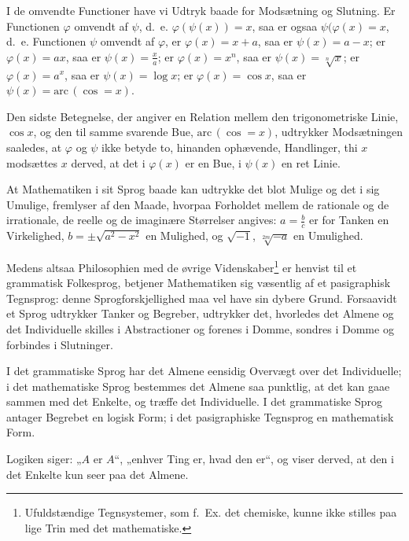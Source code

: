 \documentclass[12pt]{book}
\newcommand{\opage}[1]{\marginnote{\footnotesize\textit{[#1]}}}
\begin{document}
I de omvendte Functioner have vi Udtryk baade for Modsætning og Slutning. Er
Functionen $\varphi$ omvendt af $\psi$, d.\ e. $\varphi(\psi(x)) = x$, saa er
ogsaa $\psi(\varphi(x) = x$, d.\ e. Functionen $\psi$ omvendt af $\varphi$, er
$\varphi(x) = x+a$, saa er $\psi(x) = a-x$; er $\varphi(x) = ax$, saa er
$\psi(x) = \frac{x}{a}$; er $\varphi(x) = x^{n}$, saa er $\psi(x) = \sqrt[n]{x}$;
er $\varphi(x) = a^{x}$, saa er $\psi(x) = \log x$; er $\varphi(x) = \cos x$, saa
er $\psi(x) = \mathrm{arc}\,(\cos = x)$.

Den sidste Betegnelse, der angiver en Relation mellem den trigonometriske Linie,
$\cos x$, og den til samme svarende Bue, $\mathrm{arc}\,(\cos = x)$, udtrykker
Modsætningen saaledes, at $\varphi$ og $\psi$ ikke betyde to, hinanden
ophævende, Handlinger, thi $x$ modsættes $x$ derved, at det i $\varphi(x)$ er en
Bue, i $\psi(x)$ en ret Linie.

At Mathematiken i sit Sprog baade kan udtrykke det blot Mulige og det i sig
Umulige, fremlyser af den Maade, hvorpaa Forholdet mellem de rationale og de
irrationale, de reelle og de imaginære Størrelser angives: $a = \frac{b}{c}$ er
for Tanken en Virkelighed, $b = \pm\sqrt{a^{2}-x^{2}}$ en Mulighed, og
$\sqrt{-1}$, $\sqrt[2m]{-a}$ en Umulighed.

Medens altsaa Philosophien med de øvrige Videnskaber\footnote{Ufuldstændige
Tegnsystemer, som f.\ Ex. det chemiske, kunne ikke stilles paa lige Trin med det
mathematiske.} er henvist til et grammatisk Folkesprog, betjener Mathematiken
sig væsentlig af et pasigraphisk Tegnsprog: denne Sprogforskjellighed maa vel
have sin dybere Grund.
\opage{11} Forsaavidt et Sprog udtrykker Tanker og Begreber, udtrykker det, hvorledes det
Almene og det Individuelle skilles i Abstractioner og forenes i Domme, sondres i
Domme og forbindes i Slutninger.

I det grammatiske Sprog har det Almene eensidig Overvægt over det Individuelle; i
det mathematiske Sprog bestemmes det Almene saa punktlig, at det kan gaae sammen
med det Enkelte, og træffe det Individuelle. I det grammatiske Sprog antager
Begrebet en logisk Form; i det pasigraphiske Tegnsprog en mathematisk Form.

Logiken siger: „$A$ er $A$“, „enhver Ting er, hvad den er“, og viser derved, at
den i det Enkelte kun seer paa det Almene.
\end{document}
